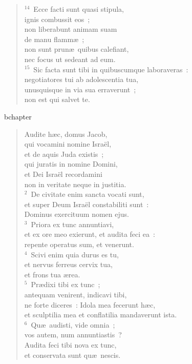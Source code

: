 \begin{verse}
${}^{14}$~Ecce facti sunt quasi stipula,\\ ignis combussit eos~;\\ non liberabunt animam suam\\ de manu flamm\ae~;\\ non sunt prun\ae\ quibus calefiant,\\ nec focus ut sedeant ad eum.\\
${}^{15}$~Sic facta sunt tibi in quibuscumque laboraveras~:\\ negotiatores tui ab adolescentia tua,\\ unusquisque in via sua erraverunt~;\\ non est qui salvet te.\end{verse}


bchapter\begin{verse}\vspace{-19pt}Audite h\ae c, domus Jacob,\\ qui vocamini nomine Isra\"el,\\ et de aquis Juda existis~;\\ qui juratis in nomine Domini,\\ et Dei Isra\"el recordamini\\ non in veritate neque in justitia.\\
${}^{2}$~De civitate enim sancta vocati sunt,\\ et super Deum Isra\"el constabiliti sunt~:\\ Dominus exercituum nomen ejus.\\
${}^{3}$~Priora ex tunc annuntiavi,\\ et ex ore meo exierunt, et audita feci ea~:\\ repente operatus sum, et venerunt.\\
${}^{4}$~Scivi enim quia durus es tu,\\ et nervus ferreus cervix tua,\\ et frons tua \ae rea.\\
${}^{5}$~Pr\ae dixi tibi ex tunc~;\\ antequam venirent, indicavi tibi,\\ ne forte diceres~: Idola mea fecerunt h\ae c,\\ et sculptilia mea et conflatilia mandaverunt ista.\\
${}^{6}$~Qu\ae\ audisti, vide omnia~;\\ vos autem, num annuntiastis~?\\ Audita feci tibi nova ex tunc,\\ et conservata sunt qu\ae\ nescis.\\

\end{verse}
